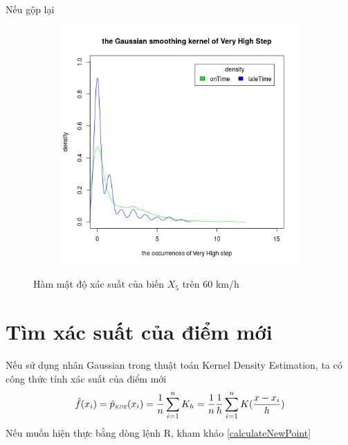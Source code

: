 \documentclass[a4paper, 13pt]{report}
\begin{document}
\FloatBarrier
Nếu gộp lại \\
\FloatBarrier
\begin{figure}[h]
    \begin{subfigure}[b]{0.7\textwidth}
        \includegraphics[width=\textwidth]{DensityVeryHighStep.png}
    \end{subfigure}
\caption*{Hàm mật độ xác suất của biến $X_5$ trên 60 km/h}
\end{figure}
\FloatBarrier
\section{Tìm xác suất của điểm mới}
Nếu sử dụng nhân Gaussian trong thuật toán Kernel Density Estimation, ta có công thức tính xác suất của điểm mới 
\[
\hat{f}(x_i) = \hat{p}_\textit{\tiny\tiny KDE}(x_i) = \frac{1}{n}\sum_{i=1}^{n} K_h = \frac{1}{n}\frac{1}{h}\sum_{i=1}^{n} K(\frac{x-x_i}{h})
\]
Nếu muốn hiện thực bằng dòng lệnh R, kham khảo \ref{calculateNewPoint}
\end{document}
